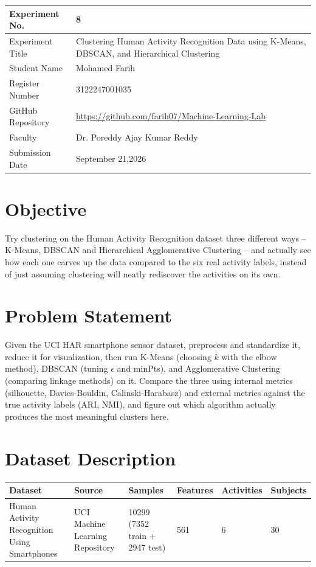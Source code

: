 \documentclass[12pt,a4paper]{article}
\begin{document}
\begin{tabular}{|p{4cm}|p{11cm}|}
\hline
Experiment No. & 8 \\ \hline
Experiment Title & Clustering Human Activity Recognition Data using K-Means, DBSCAN, and Hierarchical
Clustering \\ \hline
Student Name & Mohamed Farih \\ \hline
Register Number & 3122247001035 \\ \hline
GitHub Repository & \url{https://github.com/farih07/Machine-Learning-Lab} \\ \hline
Faculty & Dr. Poreddy Ajay Kumar Reddy \\ \hline
Submission Date & September 21,2026 \\ \hline
\end{tabular}

\section{Objective}
Try clustering on the Human Activity Recognition dataset three different ways -- K-Means, DBSCAN and
Hierarchical Agglomerative Clustering -- and actually see how each one carves up the data compared to
the six real activity labels, instead of just assuming clustering will neatly rediscover the activities
on its own.

\section{Problem Statement}
Given the UCI HAR smartphone sensor dataset, preprocess and standardize it, reduce it for
visualization, then run K-Means (choosing $k$ with the elbow method), DBSCAN (tuning $\epsilon$ and
minPts), and Agglomerative Clustering (comparing linkage methods) on it. Compare the three using
internal metrics (silhouette, Davies-Bouldin, Calinski-Harabasz) and external metrics against the true
activity labels (ARI, NMI), and figure out which algorithm actually produces the most meaningful
clusters here.

\section{Dataset Description}
\begin{longtable}{|p{3.5cm}|p{4cm}|p{1.6cm}|p{1.8cm}|p{2cm}|p{2.2cm}|}
\hline
\textbf{Dataset} & \textbf{Source} & \textbf{Samples} & \textbf{Features} & \textbf{Activities} & \textbf{Subjects} \\ \hline
Human Activity Recognition Using Smartphones & UCI Machine Learning Repository & 10299 (7352 train +
2947 test) & 561 & 6 & 30 \\ \hline
\end{longtable}
\end{document}
